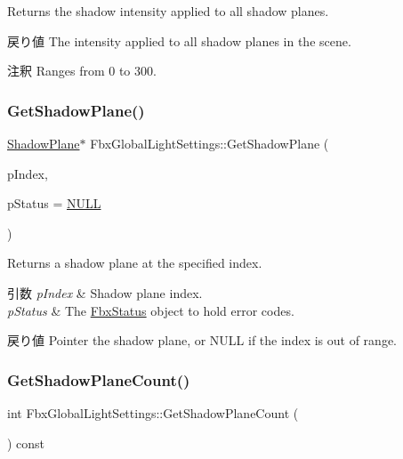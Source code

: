 Returns the shadow intensity applied to all shadow planes. \begin{DoxyReturn}{戻り値}
The intensity applied to all shadow planes in the scene. 
\end{DoxyReturn}
\begin{DoxyRemark}{注釈}
Ranges from 0 to 300. 
\end{DoxyRemark}
\mbox{\label{class_fbx_global_light_settings_aa4eb1de6e7b85273bb761b4dfc782d1d}} 
\subsubsection{\texorpdfstring{Get\+Shadow\+Plane()}{GetShadowPlane()}}
{\footnotesize\ttfamily \hyperlink{struct_fbx_global_light_settings_1_1_shadow_plane}{Shadow\+Plane}$\ast$ Fbx\+Global\+Light\+Settings\+::\+Get\+Shadow\+Plane (\begin{DoxyParamCaption}\item[{int}]{p\+Index,  }\item[{\hyperlink{class_fbx_status}{Fbx\+Status} $\ast$}]{p\+Status = {\ttfamily \hyperlink{fbxarch_8h_a070d2ce7b6bb7e5c05602aa8c308d0c4}{N\+U\+LL}} }\end{DoxyParamCaption})}

Returns a shadow plane at the specified index. 
\begin{DoxyParams}{引数}
{\em p\+Index} & Shadow plane index. \\
\hline
{\em p\+Status} & The \hyperlink{class_fbx_status}{Fbx\+Status} object to hold error codes. \\
\hline
\end{DoxyParams}
\begin{DoxyReturn}{戻り値}
Pointer the shadow plane, or {\ttfamily N\+U\+LL} if the index is out of range. 
\end{DoxyReturn}
\mbox{\label{class_fbx_global_light_settings_ac859310b4945161a224a512b1de5288d}} 
\subsubsection{\texorpdfstring{Get\+Shadow\+Plane\+Count()}{GetShadowPlaneCount()}}
{\footnotesize\ttfamily int Fbx\+Global\+Light\+Settings\+::\+Get\+Shadow\+Plane\+Count (\begin{DoxyParamCaption}{ }\end{DoxyParamCaption}) const}

